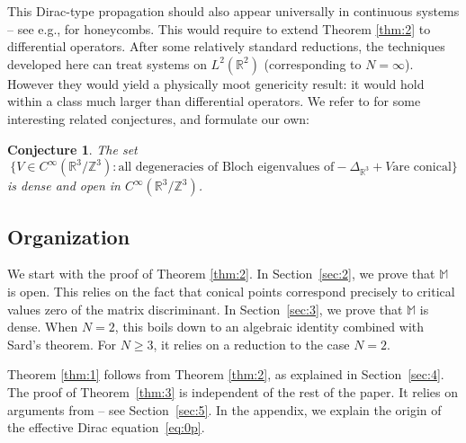 \documentclass[11pt]{article}
\newcommand{\eg}{e.g.,\xspace}
\numberwithin{equation}{section}
\let\sep:
\newtheorem{conj}{Conjecture}
\theoremstyle{definition}
\newcommand{\R}{\mathbb{R}}
\newcommand{\Mm}{\mathbb{M}}
\newcommand{\Z}{\mathbb{Z}}
\begin{document}
This Dirac-type propagation should also appear universally in continuous systems -- see \eg \cite{RH08,FLW16,D19a,DW19} for honeycombs. This would require to extend Theorem \ref{thm:2} to differential operators. After some relatively standard reductions, the techniques developed here can treat systems on $L^2(\R^2)$ (corresponding to $N = \infty$). However they would yield a physically moot genericity result: it would hold within a class much larger than differential operators. We refer to \cite{C91,K16} for some interesting related conjectures, and formulate our own:

\begin{conj} The set
\begin{equation*}
\bigl\{ V \in C^\infty(\R^3/\Z^3) \sep \text{all degeneracies of Bloch eigenvalues of} -\Delta_{\R^3}+V \text{are conical}\bigr\}
\end{equation*}
is dense and open in $C^\infty(\R^3/\Z^3)$.
\end{conj}

\subsection{Organization} We start with the proof of Theorem \ref{thm:2}. In Section~\ref{sec:2}, we prove that $\Mm$ is open. This relies on the fact that conical points correspond precisely to critical values zero of the matrix discriminant.
In Section~\ref{sec:3}, we prove that $\Mm$ is dense. When $N=2$, this boils down to an algebraic identity combined with Sard's theorem. For $N \geq 3$, it relies on a reduction to the case $N=2$.

Theorem \ref{thm:1} follows from Theorem \ref{thm:2}, as explained in Section~\ref{sec:4}. The proof of Theorem~\ref{thm:3} is independent of the rest of the paper. It relies on arguments from \cite{D19b} -- see Section~\ref{sec:5}. In the appendix, we explain the origin of the effective Dirac equation~\eqref{eq:0p}.
\end{document}
